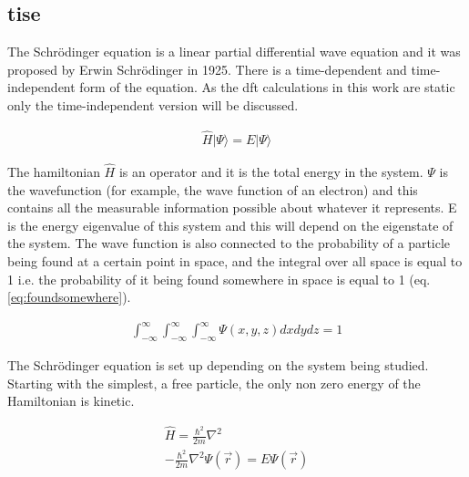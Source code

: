 \subsection{\acrlong{tise}}

The Schr\"{o}dinger equation is a linear partial differential wave equation and it was proposed by Erwin Schr\"{o}dinger in 1925.  There is a time-dependent and time-independent form of the equation.  As the \acrshort{dft} calculations in this work are static only the time-independent version will be discussed.  

\begin{equation}
\begin{split}
\hat{H} \lvert \Psi \rangle = E \lvert \Psi \rangle
\end{split}
\label{eq:eqTimeIndependentSchrodinger}
\end{equation}

The \Gls{hamiltonian} $\hat{H}$ is an operator and it is the total energy in the system.  $\Psi$ is the \gls{wavefunction} (for example, the wave function of an electron) and this contains all the measurable information possible about whatever it represents.  E is the energy eigenvalue of this system and this will depend on the eigenstate of the system.  The wave function is also connected to the probability of a particle being found at a certain point in space, and the integral over all space is equal to 1 i.e. the probability of it being found somewhere in space is equal to 1 (eq. \ref{eq:foundsomewhere}).

\begin{equation}
\begin{split}
\int_{-\infty}^{\infty} \int_{-\infty}^{\infty}  \int_{-\infty}^{\infty}  \Psi(x,y,z) dx dy dz = 1
\end{split}
\label{eq:foundsomewhere}
\end{equation}

The Schr\"{o}dinger equation is set up depending on the system being studied.  Starting with the simplest, a free particle, the only non zero energy of the Hamiltonian is kinetic.


\begin{equation}
\begin{split}
\hat{H} = \frac{\hbar^2}{2 m} \nabla^2 \\
-\frac{\hbar^2}{2 m} \nabla^2 \Psi(\vec{r}) = E \Psi(\vec{r})
\end{split}
\label{eq:eqTimeIndependentSchrodinger1}
\end{equation}


